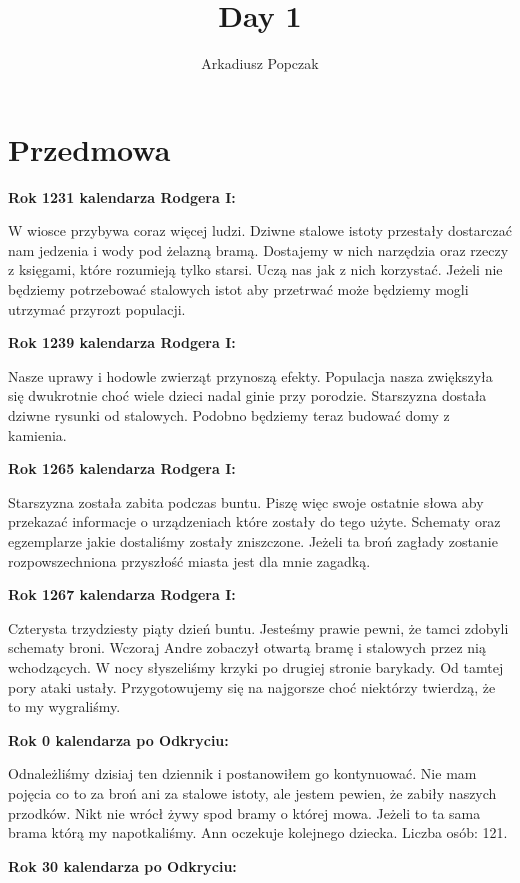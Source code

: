 \documentclass{article}
\title{\Huge{Day 1}}
\author{Arkadiusz Popczak}
\date{}
\newcommand{\textbb}[1]{
        \smallskip
        \textbf{{#1}}
        \smallskip
    }
\begin{document}
    \maketitle

    \section{Przedmowa}
    \textbb{Rok 1231 kalendarza Rodgera I:}

    W wiosce przybywa coraz więcej ludzi. Dziwne stalowe istoty przestały dostarczać nam jedzenia i wody pod żelazną bramą. Dostajemy w nich narzędzia oraz rzeczy z księgami, które rozumieją tylko starsi. Uczą nas jak z nich korzystać. Jeżeli nie będziemy potrzebować stalowych istot aby przetrwać może będziemy mogli utrzymać przyrozt populacji.

    \textbb{Rok 1239 kalendarza Rodgera I:}

    Nasze uprawy i hodowle zwierząt przynoszą efekty. Populacja nasza zwiększyła się dwukrotnie choć wiele dzieci nadal ginie przy porodzie. Starszyzna dostała dziwne rysunki od stalowych. Podobno będziemy teraz budować domy z kamienia.

    \textbb{Rok 1265 kalendarza Rodgera I:}

    Starszyzna została zabita podczas buntu. Piszę więc swoje ostatnie słowa aby przekazać informacje o urządzeniach które zostały do tego użyte. Schematy oraz egzemplarze jakie dostaliśmy zostały zniszczone. Jeżeli ta broń zagłady zostanie rozpowszechniona przyszłość miasta jest dla mnie zagadką.

    \textbb{Rok 1267 kalendarza Rodgera I:}

    Czterysta trzydziesty piąty dzień buntu. Jesteśmy prawie pewni, że tamci zdobyli schematy broni. Wczoraj Andre zobaczył otwartą bramę i stalowych przez nią wchodzących. W nocy słyszeliśmy krzyki po drugiej stronie barykady. Od tamtej pory ataki ustały. Przygotowujemy się na najgorsze choć niektórzy twierdzą, że to my wygraliśmy.

   \textbb{Rok 0 kalendarza po Odkryciu:}

   Odnależliśmy dzisiaj ten dziennik i postanowiłem go kontynuować. Nie mam pojęcia co to za broń ani za stalowe istoty, ale jestem pewien, że zabiły naszych przodków. Nikt nie wrócł żywy spod bramy o której mowa. Jeżeli to ta sama brama którą my napotkaliśmy. Ann oczekuje kolejnego dziecka. Liczba osób: 121.

    \textbb{Rok 30 kalendarza po Odkryciu:}
\end{document}

